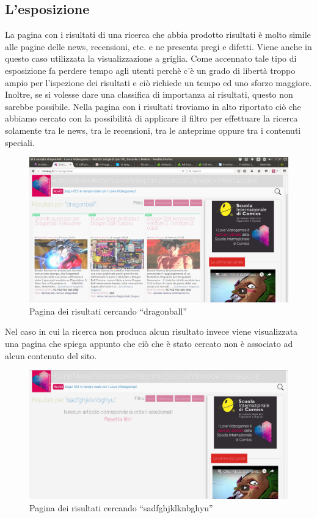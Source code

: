 \documentclass[../ProgettoTecWeb2.tex]{subfiles}
\begin{document}
	\subsection{L'esposizione}
	La pagina con i risultati di una ricerca che abbia prodotto risultati è molto simile alle pagine delle news, recensioni, etc. e ne presenta pregi e difetti. 
	Viene anche in questo caso utilizzata la visualizzazione a griglia. Come accennato tale tipo di esposizione fa perdere tempo agli utenti perchè c'è un grado di libertà troppo ampio per l'ispezione dei risultati e ciò richiede un tempo ed uno sforzo maggiore. Inoltre, se si volesse dare una classifica di importanza ai risultati, questo non sarebbe possibile.
	Nella pagina con i risultati troviamo in alto riportato ciò che abbiamo cercato con la possibilità di applicare il filtro per effettuare la ricerca solamente tra le news, tra le recensioni, tra le anteprime oppure tra i contenuti speciali.
	\begin{figure} [H]
		\centering
		\includegraphics[scale=0.2]{img/RicercaConRisultati}
		\caption{Pagina dei risultati cercando ``dragonball''}
	\end{figure}

	Nel caso in cui la ricerca non produca alcun risultato invece viene visualizzata una pagina che spiega appunto che ciò che è stato cercato non è associato ad alcun contenuto del sito.
	\begin{figure} [H]
		\centering
		\includegraphics[scale=0.2]{img/RicercaNoRisultati}
		\caption{Pagina dei risultati cercando ``sadfghjklknbghyu''}
	\end{figure}
\end{document}
